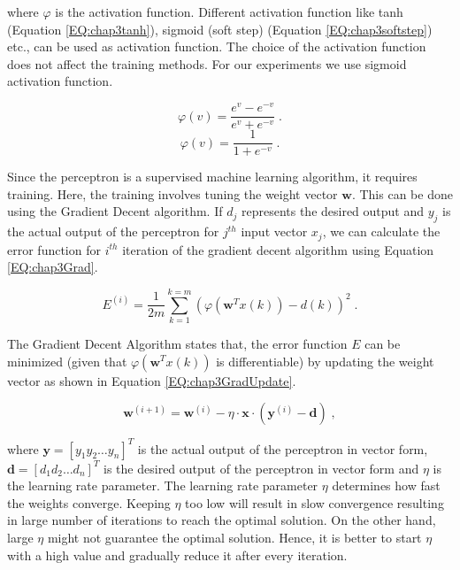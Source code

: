 	\noindent where $\varphi$ is the activation function. Different activation function like tanh (Equation \ref{EQ:chap3tanh}), sigmoid (soft step) (Equation \ref{EQ:chap3softstep}) etc., can be used as activation function. The choice of the activation function does not affect the training methods. For our experiments we use sigmoid activation function.
    
    \begin{equation}
    	\varphi(v) = \frac{e^v - e^{-v}}{e^v + e^{-v}} \;.
    	\label{EQ:chap3tanh}
    \end{equation}
    \begin{equation}
		\varphi(v) = \frac{1}{1 + e^{-v}} \;.
    	\label{EQ:chap3softstep}
    \end{equation}        
        
        
        Since the perceptron is a supervised machine learning algorithm, it requires training. Here, the training involves tuning the weight vector $\mathbf{w}$. This can be done using the Gradient Decent algorithm. If $d_j$ represents the desired output and $y_j$ is the actual output of the perceptron for $j^{th}$ input vector $x_j$, we can calculate the error function for $i^{th}$ iteration of the gradient decent algorithm using Equation \ref{EQ:chap3Grad}.
        
        \begin{equation}
        	E^{(i)} = \frac{1}{2m}\sum_{k =1}^{k = m} (\varphi(\mathbf{w}^T x(k)) - d(k))^2 \;.
        	\label{EQ:chap3Grad}
        \end{equation}
        
        The Gradient Decent Algorithm states that, the error function $E$ can be minimized (given that $\varphi(\mathbf{w}^T x(k))$ is differentiable) by updating the weight vector as shown in Equation \ref{EQ:chap3GradUpdate}.
        
        
        \begin{equation}
        	\mathbf{w}^{(i + 1)} = \mathbf{w}^{(i)} - \eta \cdot \mathbf{x} \cdot (\mathbf{y}^{(i)} - \mathbf{d}) \;,
        	\label{EQ:chap3GradUpdate}        
        \end{equation}
        
        \noindent where $\mathbf{y} = [y_1 y_2 \ldots y_n]^T$ is the actual output of the perceptron in vector form, $\mathbf{d} = [d_1 d_2 \ldots d_n]^T$ is the desired output of the perceptron in vector form and $\eta$ is the learning rate parameter. The learning rate parameter $\eta$ determines how fast the weights converge. Keeping $\eta$ too low will result in slow convergence resulting in large number of iterations to reach the optimal solution. On the other hand, large $\eta$ might not guarantee the optimal solution. Hence, it is better to start $\eta$ with a high value and gradually reduce it after every iteration.
        
